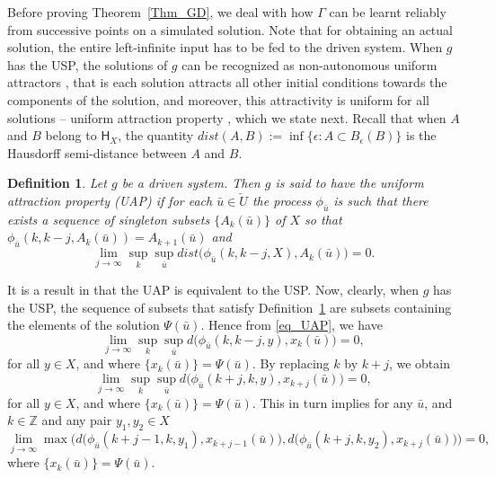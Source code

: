 \documentclass[12 pt]{article}
\newtheorem{Definition}{Definition}[]
\begin{document}
Before proving  Theorem~\ref{Thm_GD}, we deal with how $\Gamma$ can be learnt reliably from successive points on a simulated solution. Note that for obtaining an actual solution,  the entire left-infinite input has to be fed to the driven system. When $g$ has the USP, the solutions of $g$ can be recognized as non-autonomous uniform attractors \cite{Manju_Nonlinearity}, that is each solution attracts all other initial conditions towards the components of the solution, and moreover, this attractivity is uniform for all solutions -- uniform attraction property \cite{Manju_Nonlinearity}, which we state next.  Recall that when $A$ and $B$ belong to  $\mathsf{H}_X$, the quantity 
$dist(A,B):= \inf\{ \epsilon : A
\subset B_\epsilon(B)\}$ is the Hausdorff semi-distance between $A$ and $B$.
 
\begin{Definition} \rm \label{Def_UAP}
Let $g$ be a driven system. Then $g$ is said to have the uniform attraction property (UAP) if for each $\bar{u} \in \overleftarrow{U}$ the process $\phi_{\bar{u}}$	is such that 
there exists a sequence of singleton subsets  $\{A_k(\bar{u})\}$ of $X$ so that $\phi_{\bar{u}}(k,k-j,A_k(\bar{u})) = A_{k+1}(\bar{u})$ and 
\begin{equation} \label{eq_UAP}
	\lim_{j\to \infty} \sup_k \sup_{\bar{u}} dist\Big( \phi_{\bar{u}}(k,k-j,X), A_k(\bar{u})\Big) = 0.
\end{equation}
\end{Definition}
It is a result in \cite[Theorem 1]{Manju_Nonlinearity} that the UAP is equivalent to the USP. Now, clearly, when $g$ has the USP, the sequence of subsets that satisfy Definition~\ref{Def_UAP} are subsets containing the elements of the solution $\Psi(\bar{u})$.  Hence from  \eqref{eq_UAP}, we have 
$$ 
	\lim_{j\to \infty}  \sup_k \sup_{\bar{u}} d\Big( \phi_{\bar{u}}(k,k-j,y), x_k(\bar{u})\Big) = 0,
$$
for all $y \in X$, and where  $\{x_k(\bar{u})\} = \Psi(\bar{u})$.  By replacing $k$ by $k+j$, we obtain 
\begin{equation} \label{Seqn_uniform}
	\lim_{j\to \infty}  \sup_k \sup_{\bar{u}} d\Big( \phi_{\bar{u}}(k+j,k,y), x_{k+j}(\bar{u})\Big) = 0,
\end{equation}
for all $y \in X$, and where  $\{x_k(\bar{u})\} = \Psi(\bar{u})$. This in turn implies for any $\bar{u}$, and $k \in \mathbb{Z}$ and any pair $y_1,y_2 \in X$
\begin{equation} \label{Seqn_uniform2}
	\lim_{j\to \infty} 
	\max\Bigg(d\Big(\phi_{\bar{u}}(k+j-1,k,y_1), x_{k+j-1}(\bar{u})\Big),
	d\Big(\phi_{\bar{u}}(k+j,k,y_2), x_{k+j}(\bar{u})\Big)\Bigg) = 0,
\end{equation}
where  $\{x_k(\bar{u})\} = \Psi(\bar{u})$.
\end{document}

